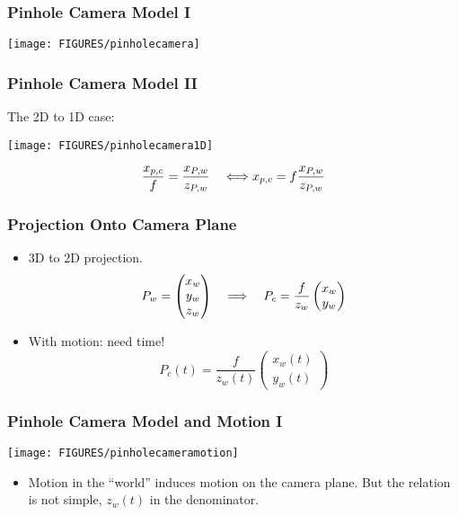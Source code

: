 \documentclass[10pt]{beamer}
\begin{document}
\begin{frame}
  \frametitle{Pinhole Camera Model I}
  \begin{center}
    \texttt{[image: FIGURES/pinholecamera]}
  \end{center}
\end{frame}

\begin{frame}
  \frametitle{Pinhole Camera Model II}
  The 2D to 1D case:
  \begin{center}
    \texttt{[image: FIGURES/pinholecamera1D]}
  \end{center}
  $$
  \frac{x_{p,c}}{f} = \frac{x_{P,w}}{z_{P,w}}\quad\Longleftrightarrow x_{p,c} = f\frac{x_{P,w}}{z_{P,w}}
  $$
  \end{frame}

\begin{frame}
  \frametitle{Projection Onto Camera Plane}
  \begin{itemize}
  \item 3D to 2D projection.
    $$
    P_w =
    \begin{pmatrix}
      x_w\\y_w\\z_w
    \end{pmatrix}
    \quad\Longrightarrow\quad
    P_c =\frac{f}{z_w}
    \begin{pmatrix}
      x_w\\y_w
    \end{pmatrix}
    $$
  \item With motion: need time!
    $$
    P_c(t) = \frac{f}{z_w(t)}
    \begin{pmatrix}
      x_w(t)\\y_w(t)
    \end{pmatrix}
    $$
  \end{itemize}
\end{frame}


\begin{frame}
  \frametitle{Pinhole Camera Model and Motion I}
  \begin{center}
    \texttt{[image: FIGURES/pinholecameramotion]}
  \end{center}
  \begin{itemize}
  \item Motion in the ``world'' induces motion on the camera plane. But the relation is
    not simple, $z_w(t)$ in the denominator.
 
  \end{itemize}
\end{frame}
\end{document}
